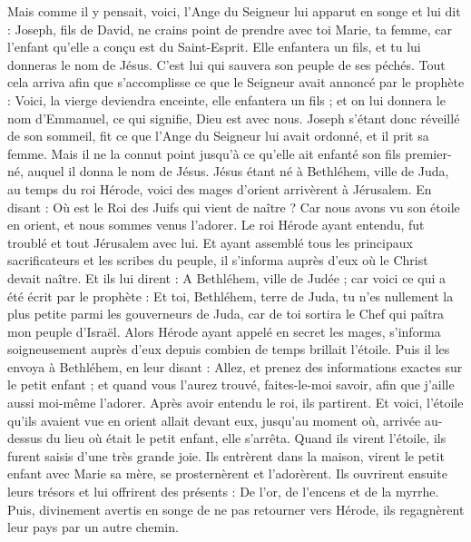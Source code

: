 \begin{multicols}{2}
Mais comme il y pensait, voici, l'Ange du Seigneur lui apparut en songe et lui dit : Joseph, fils de David, ne crains point de prendre avec toi Marie, ta femme, car l'enfant qu'elle a conçu est du Saint-Esprit.
Elle enfantera un fils, et tu lui donneras le nom de Jésus. C'est lui qui sauvera son peuple de ses péchés.
Tout cela arriva afin que s'accomplisse ce que le Seigneur avait annoncé par le prophète :
Voici, la vierge deviendra enceinte, elle enfantera un fils ; et on lui donnera le nom d'Emmanuel, ce qui signifie, Dieu est avec nous.
Joseph s'étant donc réveillé de son sommeil, fit ce que l'Ange du Seigneur lui avait ordonné, et il prit sa femme.
Mais il ne la connut point jusqu'à ce qu'elle ait enfanté son fils premier-né, auquel il donna le nom de Jésus.
\VerseOne{}Jésus étant né à Bethléhem, ville de Juda, au temps du roi Hérode, voici des mages d'orient arrivèrent à Jérusalem.
En disant : Où est le Roi des Juifs qui vient de naître ? Car nous avons vu son étoile en orient, et nous sommes venus l'adorer.
Le roi Hérode ayant entendu, fut troublé et tout Jérusalem avec lui.
Et ayant assemblé tous les principaux sacrificateurs et les scribes du peuple, il s'informa auprès d'eux où le Christ devait naître.
Et ils lui dirent : A Bethléhem, ville de Judée ; car voici ce qui a été écrit par le prophète :
Et toi, Bethléhem, terre de Juda, tu n'es nullement la plus petite parmi les gouverneurs de Juda, car de toi sortira le Chef qui paîtra mon peuple d'Israël.
Alors Hérode ayant appelé en secret les mages, s'informa soigneusement auprès d'eux depuis combien de temps brillait l'étoile.
Puis il les envoya à Bethléhem, en leur disant : Allez, et prenez des informations exactes sur le petit enfant ; et quand vous l'aurez trouvé, faites-le-moi savoir, afin que j'aille aussi moi-même l'adorer.
Après avoir entendu le roi, ils partirent. Et voici, l'étoile qu'ils avaient vue en orient allait devant eux, jusqu'au moment où, arrivée au-dessus du lieu où était le petit enfant, elle s'arrêta.
Quand ils virent l'étoile, ils furent saisis d'une très grande joie.
Ils entrèrent dans la maison, virent le petit enfant avec Marie sa mère, se prosternèrent et l'adorèrent. Ils ouvrirent ensuite leurs trésors et lui offrirent des présents : De l'or, de l'encens et de la myrrhe.
Puis, divinement avertis en songe de ne pas retourner vers Hérode, ils regagnèrent leur pays par un autre chemin.

\end{multicols}
